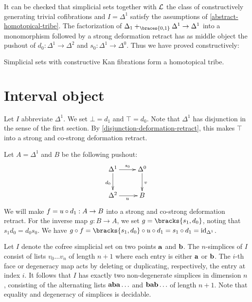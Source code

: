 \documentclass[reqno,10pt,a4paper,oneside]{amsart}
\begin{document}
It can be checked that simplicial sets together with $\mathcal{L}$ the class of constructively generating trivial cofibrations and $I = \Delta^1$ satisfy the assumptions of \cref{abstract-homotopical-tribe}.
The factorization of $\Delta_1 +_{\braces{0, 1}} \Delta^1 \to \Delta^1$ into a monomorphism followed by a strong deformation retract has as middle object the pushout of $d_0 : \Delta^1 \to \Delta^2$ and $s_0 : \Delta^1 \to \Delta^0$. 
Thus we have proved constructively:

\begin{corollary}
Simplicial sets with constructive Kan fibrations form a homotopical tribe.
\end{corollary}



\section{Interval object}


Let $I$ abbreviate $\Delta^1$.
We set $\bot = d_1$ and $\top = d_0$.
Note that $\Delta^1$ has disjunction in the sense of the first section.
By \cref{disjunction-deformation-retract}, this makes $\top$ into a strong and co-strong deformation retract.

Let $A = \Delta^1$ and $B$ be the following pushout:
\[
\xymatrix{
  \Delta^1
  \ar[r]^{s_0}
  \ar[d]_{d_0}
&
  \Delta^0
  \ar[d]^{v}
\\
  \Delta^2
  \ar[r]_{u}
&
  B
}
\]
We will make $f = u \mathbin{\circ} d_1 : A \to B$ into a strong and co-strong deformation retract.
For the inverse map $g : B \to A$, we set $g = \bracks{s_1, d_0}$, noting that $s_1 d_0 = d_0 s_0$.
We have $g \cc f = \bracks{s_1, d_0} \cc u \cc d_1 = s_1 \cc d_1 = \id_{\Delta^1}$.





Let $I$ denote the cofree simplicial set on two points $\mathbf{a}$ and $\mathbf{b}$.
The $n$-simplices of $I$ consist of lists $v_0 \ldots v_n$ of length $n+1$ where each entry is either $\mathbf{a}$ or $\mathbf{b}$.
The $i$-th face or degeneracy map acts by deleting or duplicating, respectively, the entry at index $i$.
It follows that $I$ has exactly two non-degenerate simplices in dimension $n$, consisting of the alternating lists $\mathbf{a} \mathbf{b} \mathbf{a} \ldots$ and $\mathbf{b} \mathbf{a} \mathbf{b} \ldots$ of length $n+1$.
Note that equality and degeneracy of simplices is decidable.
\end{document}
